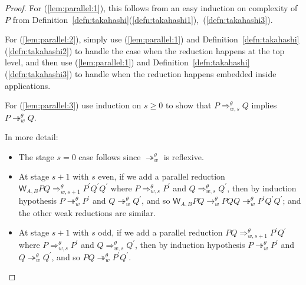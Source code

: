 \documentclass{lmcs} %
\newcommand{\param}{\theta}
\newcommand{\reduces}[2]{\rightarrow_{#1}^{#2}}
\newcommand{\transreduces}[2]{\twoheadrightarrow_{#1}^{#2}}
\newcommand{\Reduces}[2]{\Rightarrow_{#1}^{#2}}
\newcommand{\ctW}[4]{{\mathsf W}_{#1, #2}#3#4}
\begin{document}
\begin{proof}
For (\ref{lem:parallel:1}), this follows from an easy induction on complexity of $P$ from Definition~\ref{defn:takahashi}(\ref{defn:takahashi1}),~(\ref{defn:takahashi3}).

For (\ref{lem:parallel:2}), simply use (\ref{lem:parallel:1}) and Definition~\ref{defn:takahashi}(\ref{defn:takahashi2}) to handle the case when the reduction happens at the top level, and then use (\ref{lem:parallel:1}) and Definition~\ref{defn:takahashi}(\ref{defn:takahashi3}) to handle when the reduction happens embedded inside applications. 

For (\ref{lem:parallel:3}) use induction on $s\geq 0$ to show that $P\Reduces{w,s}{\param} Q$ implies $P\transreduces{w}{\param} Q$. 

\begin{proofdetail}
In more detail:
\begin{itemize}[leftmargin=*]
    \item The stage $s=0$ case follows since $\transreduces{w}{\param}$ is reflexive.
    \item At stage $s+1$ with $s$ even, if we add a parallel reduction $\ctW{A}{B}{P}{Q}\Reduces{w,s+1}{\param} P^{\prime}Q^{\prime}Q^{\prime}$ where $P\Reduces{w,s}{\param} P^{\prime}$ and $Q\Reduces{w,s}{\param} Q^{\prime}$, then by induction hypothesis $P\transreduces{w}{\param} P^{\prime}$ and $Q\transreduces{w}{\param} Q^{\prime}$, and so $\ctW{A}{B}{P}{Q}\reduces{w}{\param} PQQ \transreduces{w}{\param} P^{\prime}Q^{\prime}Q^{\prime}$; and the other weak reductions are similar.
    \item At stage $s+1$ with $s$ odd, if we add a parallel reduction $PQ\Reduces{w,s+1}{\param} P^{\prime}Q^{\prime}$ where $P\Reduces{w,s}{\param} P^{\prime}$ and $Q\Reduces{w,s}{\param} Q^{\prime}$, then by induction hypothesis $P\transreduces{w}{\param} P^{\prime}$ and $Q\transreduces{w}{\param} Q^{\prime}$, and so $PQ \transreduces{w}{\param} P^{\prime} Q^{\prime}$.     
\end{itemize}
\end{proofdetail}


\end{proof}
\end{document}
